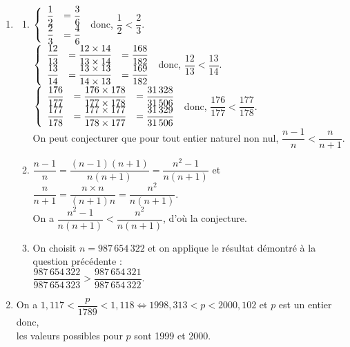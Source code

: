 \begin{corrige}
\ \\ [-5mm]
   \begin{enumerate}
      \item
         \begin{enumerate}
            \item {
               $\left\{\begin{array}{cccc} \dfrac12 & = \dfrac36\\ \dfrac23 & = \dfrac46 \end{array}\right.$ \qquad donc, \qquad $\dfrac12<\dfrac23$. \\ [1mm]
               $\left\{\begin{array}{cccc} \dfrac{12}{13} & = \dfrac{12\times14}{13\times14} & =\dfrac{168}{182}\\ \dfrac{13}{14} & =\dfrac{13\times13}{14\times13} & =\dfrac{169}{182} \end{array}\right.$ \qquad donc, \qquad $\dfrac{12}{13}<\dfrac{13}{14}$. \\ [1mm]
               $\left\{\begin{array}{cccc} \dfrac{176}{177} & =\dfrac{176\times178}{177\times178} & =\dfrac{31\,328}{31\,506}\\ \dfrac{177}{178} & =\dfrac{177\times177}{178\times177} & =\dfrac{31\,329}{31\,506} \end{array}\right.$ \qquad donc, \qquad $\dfrac{176}{177}<\dfrac{177}{178}$. \\ [1mm]
               On peut conjecturer que pour tout entier naturel non nul, {\blue $\dfrac{n-1}{n}<\dfrac{n}{n+1}$.}} \\ [1mm]
            \item $\dfrac{n-1}{n} =\dfrac{(n-1)(n+1)}{n(n+1)} =\dfrac{n^2-1}{n(n+1)}$ \quad et \quad $\dfrac{n}{n+1} =\dfrac{n\times n}{(n+1)n} =\dfrac{n^2}{n(n+1)}$. \\ [1mm]
               On a $\dfrac{n^2-1}{n(n+1)}<\dfrac{n^2}{n(n+1)}$, d'où la conjecture. \\ [1mm]
            \item On choisit $n =987\,654\,322$ et on applique le résultat démontré à la question précédente : \\ [2mm]
               {\blue $\dfrac{987\,654\,322}{987\,654\,323}>\dfrac{987\,654\,321}{987\,654\,322}$.} \\ [1mm]
         \end{enumerate}
      \item On a $1,117<\dfrac{p}{1789}<1,118 \iff 1998,313<p<2000,102$ et $p$ est un entier donc, \\ [1mm]
         {\blue les valeurs possibles pour $p$ sont 1999 et 2000.}
   \end{enumerate}
\end{corrige}


\bigskip


